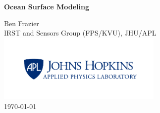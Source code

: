 \documentclass[12pt]{../packages/thesis}  %
\numberwithin{equation}{chapter}
\renewcommand{\baselinestretch}{2}
\begin{document}
\titlepage
\begin{center}
\vspace*{25pt}
{\huge \bfseries Ocean Surface Modeling\\}

\vspace{150 pt}

\large Ben Frazier \\
 \small IRST and Sensors Group (FPS/KVU), JHU/APL \\
\includegraphics[width=0.6\textwidth]{../media/apl_small_horizontal_blue} \\
\vspace{125pt}
\large \today
\end{center}

\newpage
\pagestyle{plain}
\setcounter{page}{2}

\renewcommand{\baselinestretch}{1}
\small\normalsize
\tableofcontents %
\newpage
\listoffigures %
\newpage
\listoftables %
\newpage


\setlength{\parskip}{0em}
\renewcommand{\baselinestretch}{2}
\small\normalsize


\setcounter{page}{1}



\newpage
 

\end{document}
